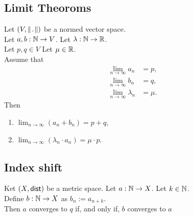 \subsection{Limit Theoroms}
Let $(V, \norm)$ be a normed vector space.\\
Let $a,b : \mathbb{N} \to V$. Let $\lambda : \mathbb{N} \to \mathbb{R}$.\\
Let $p,q \in V$ Let $\mu \in \mathbb{R}$.\\
Assume that
\begin{align*}
    \lim_{n \to \infty} a_n &= p,\\
    \lim_{n \to \infty} b_n &= q,\\
    \lim_{n \to \infty} \lambda_n &= \mu.
\end{align*}
Then
\begin{enumerate}
    \item $\lim_{n \to \infty} (a_n + b_n) = p + q$,
    \item $\lim_{n \to \infty} (\lambda_n \cdot a_n) = \mu \cdot p$.
\end{enumerate}


\subsection{Index shift}
Ket $(X, \mathsf{dist})$ be a metric space. Let $a : \mathbb{N} \to X$. Let $k \in \mathbb{N}$.\\
Define $b : \mathbb{N} \to X$ as $b_n := a_{n+k}$.\\
Then $a$ converges to $q$ if, and only if, $b$ converges to $a$
